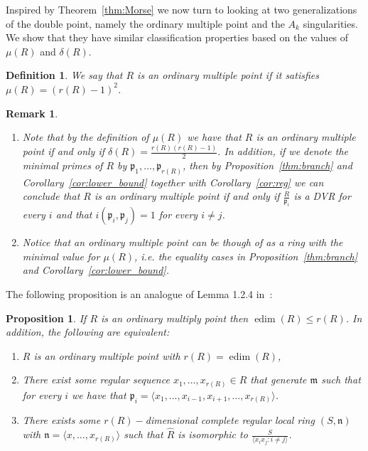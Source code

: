 \documentclass{article}
\newtheorem{definition}[theorem]{Definition}
\newtheorem{proposition}[theorem]{Proposition}
\newtheorem{remark}[theorem]{Remark}
\DeclareMathOperator{\edim}{edim}
\numberwithin{theorem}{section}
\begin{document}
Inspired by Theorem~\ref{thm:Morse} we now turn to looking at two generalizations of the double point, namely the ordinary multiple point and the $A_k$ singularities. We show that they have similar classification properties based on the values of $\mu(R)$ and $\delta(R)$.  

\begin{definition}\label{def:omp}
    We say that $R$ is an ordinary multiple point if it satisfies $\mu(R)=(r(R)-1)^2$.  
\end{definition}

\begin{remark}\label{rem:omp}
\begin{enumerate}
    \item \textup{Note that by the definition of $\mu(R)$ we have that $R$ is an ordinary multiple point if and only if $\delta(R)=\frac{r(R)(r(R)-1)}{2}$. In addition, if we denote the minimal primes of $R$ by $\mathfrak{p}_1, \dots, \mathfrak{p}_{r(R)}$, then by Proposition~\ref{thm:branch} and Corollary~\ref{cor:lower_bound} together with Corollary~\ref{cor:reg} we can conclude that $R$ is an ordinary multiple point if and only if $\frac{R}{\mathfrak{p}_i}$ is a DVR for every $i$ and that $i(\mathfrak{p}_i, \mathfrak{p}_j)=1$ for every $i \neq j$. }
    \item \textup{Notice that an ordinary multiple point can be though of as a ring with the minimal value for $\mu(R)$, i.e. the equality cases in Proposition~\ref{thm:branch} and Corollary~\ref{cor:lower_bound}. }
\end{enumerate}
\end{remark}

The following proposition is an analogue of Lemma 1.2.4 in~\cite{buchweitz1980milnor}:

\begin{proposition}\label{prop:omp_lines}
If $R$ is an ordinary multiply point then $\edim(R) \leq r(R)$. In addition, the following are equivalent:
\begin{enumerate}
    \item $R$ is an ordinary multiple point with $r(R)=\edim(R)$, 
    \item There exist some regular sequence $x_1, \dots, x_{r(R)} \in R$ that generate $\mathfrak{m}$ such that for every $i$ we have that $\mathfrak{p}_i = \langle x_1, \dots, x_{i-1}, x_{i+1}, \dots, x_{r(R)} \rangle$.
    \item There exists some $r(R)-$dimensional complete regular local ring $(S, \mathfrak{n})$ with $\mathfrak{n} =\langle x, \dots, x_{r(R)} \rangle$ such that $\hat{R}$ is isomorphic to $\frac{S}{\langle x_ix_j \colon i \neq j \rangle}$.
\end{enumerate}
\end{proposition}
\end{document}
